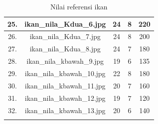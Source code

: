 \begin{longtable}{|c|c|c|c|c|}
        \hline
        25. & ikan\_nila\_Kdua\_6.jpg & 24 & 8 & 220 \\
        \hline
        26. & ikan\_nila\_Kdua\_7.jpg & 24 & 8 & 200 \\
        \hline
        27. & ikan\_nila\_Kdua\_8.jpg & 24 & 7 & 180 \\
        \hline
        28. & ikan\_nila\_kbawah\_9.jpg & 19 & 6 & 135 \\
        \hline
        29. & ikan\_nila\_kbawah\_10.jpg & 22 & 8 & 180 \\
        \hline
        30. & ikan\_nila\_kbawah\_11.jpg & 20 & 7 & 160 \\
        \hline
        31. & ikan\_nila\_kbawah\_12.jpg & 19 & 7 & 120 \\
        \hline
        32. & ikan\_nila\_kbawah\_13.jpg & 20 & 6 & 140 \\
        \hline
    \caption{Nilai referensi ikan}\label{tab:Nilai Referensi}
\end{longtable}